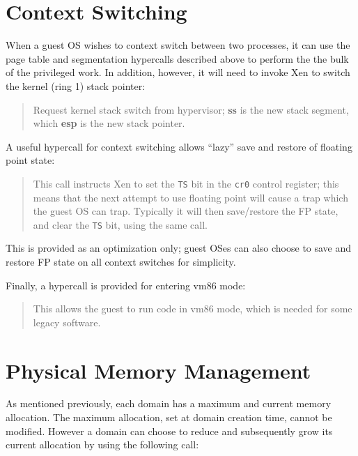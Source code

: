 \documentclass[11pt,twoside,final,openright,a4paper]{report}
\newcommand{\hypercall}[1]{\vspace{2mm}{\sf #1}}
\begin{document}
\section{Context Switching} 

When a guest OS wishes to context switch between two processes, 
it can use the page table and segmentation hypercalls described
above to perform the the bulk of the privileged work. In addition, 
however, it will need to invoke Xen to switch the kernel (ring 1) 
stack pointer: 

\begin{quote} 
\hypercall{stack\_switch(unsigned long ss, unsigned long esp)} 

Request kernel stack switch from hypervisor; {\bf ss} is the new 
stack segment, which {\bf esp} is the new stack pointer. 

\end{quote} 

A useful hypercall for context switching allows ``lazy'' save and
restore of floating point state:

\begin{quote}
\hypercall{fpu\_taskswitch(int set)} 

This call instructs Xen to set the {\tt TS} bit in the {\tt cr0}
control register; this means that the next attempt to use floating
point will cause a trap which the guest OS can trap. Typically it will
then save/restore the FP state, and clear the {\tt TS} bit, using the
same call.
\end{quote} 

This is provided as an optimization only; guest OSes can also choose
to save and restore FP state on all context switches for simplicity. 

Finally, a hypercall is provided for entering vm86 mode:

\begin{quote}
\hypercall{switch\_vm86}

This allows the guest to run code in vm86 mode, which is needed for
some legacy software.
\end{quote}

\section{Physical Memory Management}

As mentioned previously, each domain has a maximum and current 
memory allocation. The maximum allocation, set at domain creation 
time, cannot be modified. However a domain can choose to reduce 
and subsequently grow its current allocation by using the
following call: 
\end{document}
